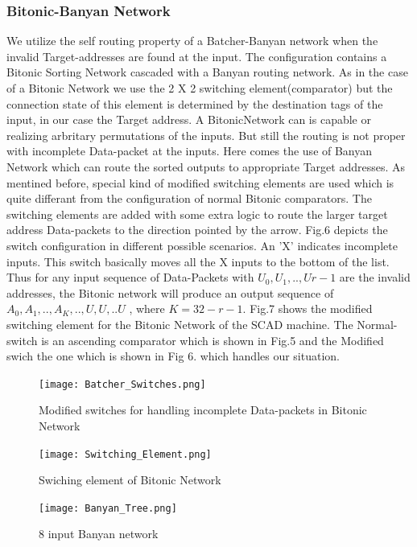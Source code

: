 \documentclass[adraft]{eptcs}
\begin{document}
				  \subsubsection{Bitonic-Banyan Network}
					      We utilize the self routing property of a Batcher-Banyan network \cite{batcher_banyan_ref} when the invalid Target-addresses are found at the input. The configuration contains
					      a Bitonic Sorting Network cascaded with a Banyan routing network. As in the case of a Bitonic Network we use the 2 X 2 switching element(comparator) but the connection state of this
					      element is determined by the destination tags of the input, in our case the Target address. A BitonicNetwork can is capable or realizing arbritary permutations of the inputs. 
					      But still the routing is not proper with incomplete Data-packet at the inputs. Here comes the use of Banyan Network which can route the sorted outputs to appropriate
					      Target addresses. As mentined before, special kind of modified switching elements are used which is quite differant from the configuration of normal Bitonic comparators.
					      The switching elements are added with some extra logic to route the larger target address Data-packets to the direction pointed by the arrow. 
					      Fig.6 depicts the switch configuration in different possible scenarios. An 'X' indicates incomplete inputs. This switch basically moves all the X inputs to the bottom of the list.
					      Thus for any input sequence of Data-Packets with $U_{0},U_{1},..,U{r-1}$  are the invalid addresses, the Bitonic network will produce an output sequence of $A_{0},A_{1},..,A_{K},..,U,U,..U$ , where
					      $ K = 32 - r -1$. Fig.7 shows the modified switching element for the Bitonic Network of the SCAD machine. The Normal-switch is an ascending comparator which is shown in Fig.5 and
					      the Modified swich the one which is shown in Fig 6.
					      which handles our situation.
						      \begin{figure}[!ht]
						      \texttt{[image: Batcher\_Switches.png]}
						      \caption{Modified switches for handling incomplete Data-packets in Bitonic Network}
					      \end{figure}
					      \begin{figure}[!ht]
						      \texttt{[image: Switching\_Element.png]}
						      \caption{Swiching element of Bitonic Network}
					      \end{figure}
					      \begin{figure}[!ht]
						      \texttt{[image: Banyan\_Tree.png]}
						      \caption{8 input Banyan network}
					      \end{figure}
\end{document}
